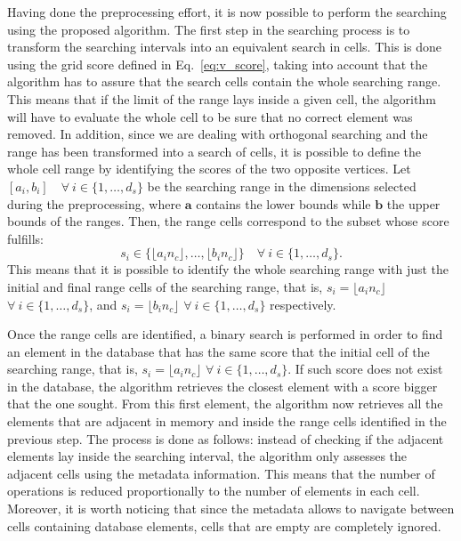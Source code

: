 \documentclass[preprint,12pt]{elsarticle}
\begin{document}
Having done the preprocessing effort, it is now possible to perform the searching using the proposed algorithm. The first step in the searching process is to transform the searching intervals into an equivalent search in cells. This is done using the grid score defined in Eq.~\eqref{eq:v_score}, taking into account that the algorithm has to assure that the search cells contain the whole searching range. This means that if the limit of the range lays inside a given cell, the algorithm will have to evaluate the whole cell to be sure that no correct element was removed. In addition, since we are dealing with orthogonal searching and the range has been transformed into a search of cells, it is possible to define the whole cell range by identifying the scores of the two opposite vertices. Let $[a_i, b_i] \quad \forall \: i\in\{1, \dots, d_s\}$ be the searching range in the dimensions selected during the preprocessing, where $\mathbf{a}$ contains the lower bounds while $\mathbf{b}$ the upper bounds of the ranges. Then, the range cells correspond to the subset whose score fulfills:
\begin{equation}
s_i \in \{\lfloor a_in_c \rfloor,\dots, \lfloor b_in_c \rfloor\} \quad \forall \: i \in \{1,\dots,d_s\}.
\end{equation}
This means that it is possible to identify the whole searching range with just the initial and final range cells of the searching range, that is, $s_i = \lfloor a_in_c \rfloor$ $\forall \: i \in \{1,\dots,d_s\}$, and $s_i = \lfloor b_in_c \rfloor$ $\forall \: i \in \{1,\dots,d_s\}$ respectively.

Once the range cells are identified, a binary search is performed in order to find an element in the database that has the same score that the initial cell of the searching range, that is, $s_i = \lfloor a_in_c \rfloor$ $\forall \: i\in\{1,\dots,d_s\}$. If such score does not exist in the database, the algorithm retrieves the closest element with a score bigger that the one sought. From this first element, the algorithm now retrieves all the elements that are adjacent in memory and inside the range cells identified in the previous step. The process is done as follows: instead of checking if the adjacent elements lay inside the searching interval, the algorithm only assesses the adjacent cells using the metadata information. This means that the number of operations is reduced proportionally to the number of elements in each cell. Moreover, it is worth noticing that since the metadata allows to navigate between cells containing database elements, cells that are empty are completely ignored.
\end{document}

